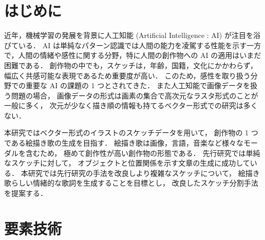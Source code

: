 \documentclass[twocolumn]{jarticle}     %
\begin{document}


\section{はじめに}








  近年，機械学習の発展を背景に人工知能 (Artificial Intelligence : AI) が注目を浴びている．
  AI は単純なパターン認識では人間の能力を凌駕する性能を示す一方で，人間の情緒や感性に関する分野，特に人間の創作物への AI の適用はいまだ困難である．
  創作物の中でも，スケッチは，年齢，国籍，文化にかかわらず，幅広く共感可能な表現であるため重要度が高い．
  このため，感性を取り扱う分野での重要な AI の課題の 1 つとされてきた．
  また人工知能で画像データを扱う問題の場合，
  画像データの形式は画素の集合で高次元なラスタ形式のことが一般に多く，
  次元が少なく描き順の情報も持てるベクター形式での研究は多くない．

  本研究ではベクター形式のイラストのスケッチデータを用いて，
  創作物の 1 つである絵描き歌の生成を目指す．
  絵描き歌は画像，言語，音楽など様々なモーダルを含むため，
  極めて創作性が高い創作物の形態である．
  先行研究では単純なスケッチに対して，
  オブジェクトと位置関係を示す文章の生成に成功している．
  本研究では先行研究の手法を改良しより複雑なスケッチについて，
  絵描き歌らしい情緒的な歌詞を生成することを目標とし，
  改良したスケッチ分割手法を提案する．


\section{要素技術}
\end{document}
